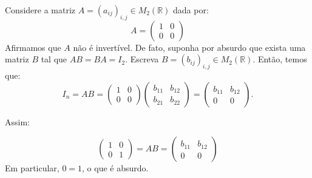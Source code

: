 \begin{example}
    Considere a matriz $A=(a_{ij})_{i, j}\in M_{2}(\mathbb R)$ dada por:
    \begin{equation*}
        A = \begin{pmatrix}
            1 & 0 \\
            0 & 0
        \end{pmatrix}
    \end{equation*}
    Afirmamos que $A$ não é invertível.
    De fato, suponha por absurdo que exista uma matriz $B$ tal que $AB=BA=I_2$.
    Escreva $B=(b_{ij})_{i, j}\in M_{2}(\mathbb R)$.
    Então, temos que:
    \begin{equation*}
        I_n=AB = \begin{pmatrix}
            1 & 0 \\
            0 & 0
        \end{pmatrix} \begin{pmatrix}
            b_{11} & b_{12} \\
            b_{21} & b_{22}
        \end{pmatrix} = \begin{pmatrix}
            b_{11} & b_{12} \\
            0 & 0
        \end{pmatrix}.
    \end{equation*}

    Assim:

    \begin{equation*}
        \begin{pmatrix}
            1 & 0 \\
            0 & 1
        \end{pmatrix}
        = AB = \begin{pmatrix}
            b_{11} & b_{12} \\
            0 & 0
        \end{pmatrix}
    \end{equation*}
    Em particular, $0=1$, o que é absurdo.
\end{example}